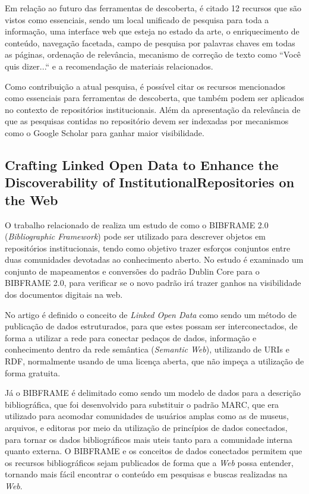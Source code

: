 Em relação ao futuro das ferramentas de descoberta,
é citado 12 recursos que são vistos como essenciais, sendo um local
unificado de pesquisa para toda a informação, uma interface web
que esteja no estado da arte, o enriquecimento de conteúdo, navegação
facetada, campo de pesquisa por palavras chaves em todas as páginas,
ordenação de relevância, mecanismo de correção de texto como ``Você quis dizer...``
e a recomendação de materiais relacionados.

Como contribuição a atual pesquisa, é possível citar os recursos mencionados
como essenciais para ferramentas de descoberta, que também podem ser aplicados
no contexto de repositórios institucionais. Além da apresentação da relevância
de que as pesquisas contidas no repositório devem ser indexadas por mecanismos
como o Google Scholar para ganhar maior visibilidade.

\subsection{Crafting Linked Open Data to Enhance the Discoverability of InstitutionalRepositories on the Web}

O trabalho relacionado de \cite{2019:Jin} realiza um estudo de como o BIBFRAME 2.0
(\emph{Bibliographic Framework}) pode ser utilizado para descrever objetos em repositórios institucionais, tendo como
objetivo trazer esforços conjuntos entre duas comunidades devotadas ao
conhecimento aberto. No estudo é examinado um conjunto de mapeamentos e conversões
do padrão Dublin Core para o BIBFRAME 2.0, para verificar se o novo padrão irá
trazer ganhos na visibilidade dos documentos digitais na web.

No artigo é definido o conceito de \emph{Linked Open Data} como sendo um
método de publicação de dados estruturados, para que estes possam ser
interconectados, de forma a utilizar a rede para conectar pedaços de dados,
informação e  conhecimento dentro da rede semântica (\emph{Semantic Web}), utilizando de URIs e
RDF, normalmente usando de uma licença aberta, que não impeça a utilização
de forma gratuita.

Já o BIBFRAME é delimitado como sendo um modelo de dados para a descrição
bibliográfica, que foi desenvolvido para substituir o padrão MARC, que
era utilizado para acomodar comunidades de usuários amplas como as de museus,
arquivos, e editoras por meio da utilização de princípios de dados conectados,
para tornar os dados bibliográficos mais uteis tanto para a comunidade interna
quanto externa. O BIBFRAME e os conceitos de dados conectados permitem que
os recursos bibliográficos sejam publicados de forma que a \emph{Web} possa
entender, tornando mais fácil encontrar o conteúdo em pesquisas
e buscas realizadas na \emph{Web}.

